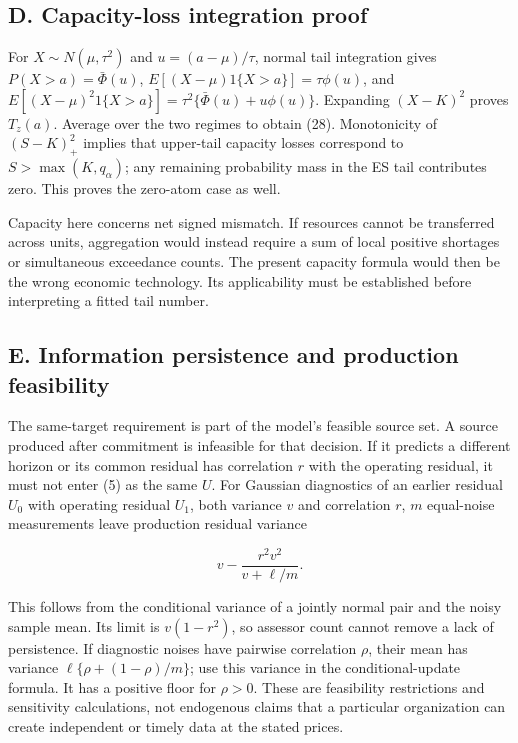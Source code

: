 \documentclass[
  11pt,
]{article}
\begin{document}
\subsection{D. Capacity-loss integration
proof}\label{d.-capacity-loss-integration-proof}

For \(X\sim N(\mu,\tau^2)\) and \(u=(a-\mu)/\tau\), normal tail
integration gives \(P(X>a)=\bar\Phi(u)\),
\(E[(X-\mu)1\{X>a\}]=\tau\phi(u)\), and
\(E[(X-\mu)^2 1\{X>a\}]=\tau^2\{\bar\Phi(u)+u\phi(u)\}\). Expanding
\((X-K)^2\) proves \(T_z(a)\). Average over the two regimes to obtain
(28). Monotonicity of \((S-K)_+^2\) implies that upper-tail capacity
losses correspond to \(S>\max(K,q_\alpha)\); any remaining probability
mass in the ES tail contributes zero. This proves the zero-atom case as
well.

Capacity here concerns net signed mismatch. If resources cannot be
transferred across units, aggregation would instead require a sum of
local positive shortages or simultaneous exceedance counts. The present
capacity formula would then be the wrong economic technology. Its
applicability must be established before interpreting a fitted tail
number.

\subsection{E. Information persistence and production
feasibility}\label{e.-information-persistence-and-production-feasibility}

The same-target requirement is part of the model's feasible source set.
A source produced after commitment is infeasible for that decision. If
it predicts a different horizon or its common residual has correlation
\(r\) with the operating residual, it must not enter (5) as the same
\(U\). For Gaussian diagnostics of an earlier residual \(U_0\) with
operating residual \(U_1\), both variance \(v\) and correlation \(r\),
\(m\) equal-noise measurements leave production residual variance

\[v-\frac{r^2v^2}{v+\ell/m}.\]

This follows from the conditional variance of a jointly normal pair and
the noisy sample mean. Its limit is \(v(1-r^2)\), so assessor count
cannot remove a lack of persistence. If diagnostic noises have pairwise
correlation \(\rho\), their mean has variance
\(\ell\{\rho+(1-\rho)/m\}\); use this variance in the conditional-update
formula. It has a positive floor for \(\rho>0\). These are feasibility
restrictions and sensitivity calculations, not endogenous claims that a
particular organization can create independent or timely data at the
stated prices.
\end{document}
